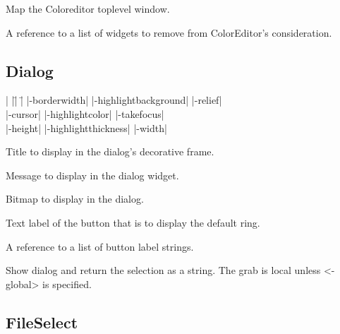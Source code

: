 \vskip5pt

\begin{enum}{1cm}

Map the Coloreditor toplevel window.

A reference to a list of widgets to remove from ColorEditor's consideration.

\end{enum}

\subsection*{Dialog}
\vspace{-4pt}

\begin{tabbing}
|                   |\=|                     |\= \kill
|-borderwidth| \> |-highlightbackground|     \> |-relief| \\   
|-cursor|      \> |-highlightcolor|          \> |-takefocus| \\
|-height|      \> |-highlightthickness|      \> |-width| \\
\end{tabbing}

\vskip5pt
\begin{enum}{1cm}

 Title to display in the dialog's decorative frame.

 Message to display in the dialog widget.

 Bitmap to display in the dialog.

 Text label of the button that is to display the
default ring.

 A reference to a list of button label strings.

\end{enum}

\vskip5pt

\begin{enum}{1cm}

 Show dialog and return the
selection as a string.  The grab is local unless <-global> is specified.

\end{enum}

\subsection*{FileSelect}
\vspace{-4pt}

